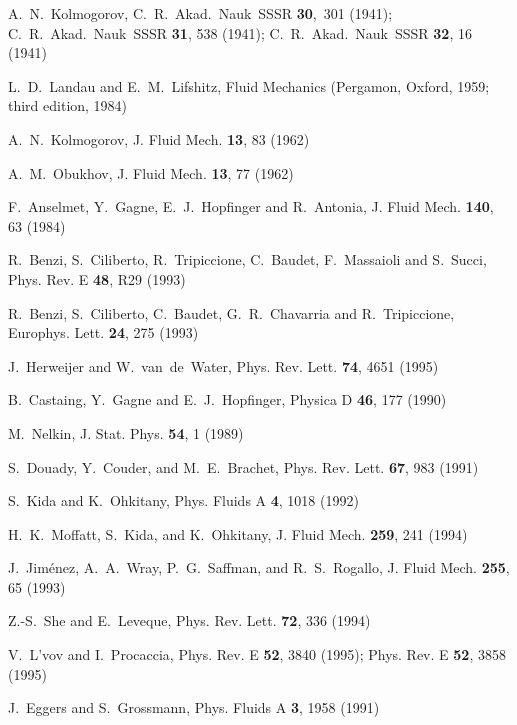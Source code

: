 \documentclass[dc]{svjour}
\begin{document}
\begin{thebibliography}{47}

 A.~N.~Kolmogorov,
C.~R.~Akad.~Nauk~SSSR {\bf 30},~301 (1941);
C.~R.~Akad.~Nauk~SSSR {\bf 31}, 538 (1941);
C.~R.~Akad.~Nauk~SSSR {\bf 32}, 16 (1941)

 L.~D.~Landau and E.~M.~Lifshitz, {Fluid
    Mechanics} (Pergamon, Oxford, 1959; third edition, 1984)

 A.~N.~Kolmogorov,  J. Fluid Mech. {\bf 13},
 83 (1962)

 A.~M.~Obukhov,  J. Fluid Mech. {\bf
    13}, 77 (1962)

 F.~Anselmet, Y.~Gagne, E.~J.~Hopfinger and R.~Antonia,
J. Fluid Mech. {\bf 140}, 63 (1984)

 R.~Benzi, S.~Ciliberto, R.~Tripiccione, C.~Baudet,
  F.~Massaioli and S.~Succi,  Phys. Rev. E {\bf 48}, R29 (1993)

 R.~Benzi, S.~Ciliberto, C.~Baudet, G.~R.~Chavarria and
  R.~Tripiccione,  Europhys. Lett. {\bf 24}, 275 (1993)

 J.~Herweijer and W.~van~de~Water,  Phys.
    Rev. Lett. {\bf 74}, 4651 (1995)

 B.~Castaing, Y.~Gagne and E.~J.~Hopfinger,
 Physica D {\bf 46}, 177 (1990)

 M.~Nelkin, J. Stat. Phys. {\bf 54}, 1 (1989)

 S.~Douady, Y.~Couder, and M.~E.~Brachet,
 Phys. Rev. Lett. {\bf 67}, 983 (1991)

 S.~Kida and K.~Ohkitany,  Phys. Fluids A
         {\bf 4}, 1018 (1992)

 H.~K.~Moffatt, S.~Kida, and K.~Ohkitany,
        {J. Fluid Mech.} {\bf 259}, 241 (1994)

 J.~Jim\'{e}nez, A.~A.~Wray, P.~G.~Saffman, and
        R.~S.~Rogallo,  J. Fluid Mech. {\bf 255}, 65 (1993)

 Z.-S.~She and E.~Leveque,  Phys. Rev. Lett.
    {\bf 72}, 336 (1994)

 V.~L'vov and I.~Procaccia,
  Phys. Rev. E {\bf 52}, 3840 (1995);
 Phys. Rev. E {\bf 52}, 3858 (1995)

 J.~Eggers and S.~Grossmann,  Phys. Fluids A
    {\bf 3}, 1958 (1991)


\end{thebibliography}
\end{document}
